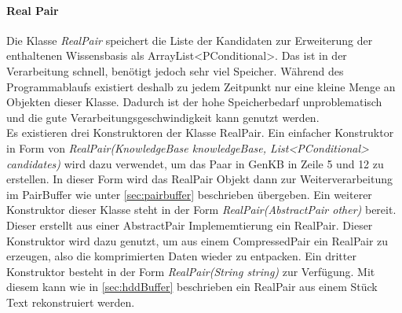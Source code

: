 \documentclass[12pt,a4paper]{article}
\begin{document}
\paragraph{Real Pair}
\label{sec:realpair}
Die Klasse \textit{RealPair} speichert die Liste der Kandidaten zur Erweiterung der enthaltenen Wissensbasis als ArrayList<PConditional>. Das ist in der Verarbeitung schnell, benötigt jedoch sehr viel Speicher. Während des Programmablaufs existiert deshalb zu jedem Zeitpunkt nur eine kleine Menge an Objekten dieser Klasse. Dadurch ist der hohe Speicherbedarf unproblematisch und die gute Verarbeitungsgeschwindigkeit kann genutzt werden. \\
Es existieren drei Konstruktoren der Klasse RealPair. Ein einfacher Konstruktor in Form von \textit{RealPair(KnowledgeBase knowledgeBase, List<PConditional> candidates)} wird dazu verwendet, um das Paar in GenKB in Zeile 5 und 12 zu erstellen. In dieser Form wird das RealPair Objekt dann zur Weiterverarbeitung im PairBuffer wie unter \ref{sec:pairbuffer} beschrieben übergeben. Ein weiterer Konstruktor dieser Klasse steht in der Form \textit{RealPair(AbstractPair other)} bereit. Dieser erstellt aus einer AbstractPair Implememtierung ein RealPair. Dieser Konstruktor wird dazu genutzt, um aus einem CompressedPair ein RealPair zu erzeugen, also die komprimierten Daten wieder zu entpacken. Ein dritter Konstruktor besteht in der Form \textit{RealPair(String string)} zur Verfügung. Mit diesem kann wie in \autoref{sec:hddBuffer} beschrieben ein RealPair aus einem Stück Text rekonstruiert werden.
\end{document}
